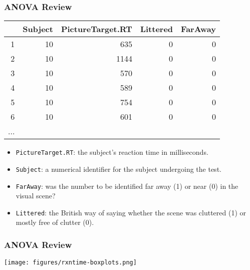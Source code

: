 \documentclass[11pt,containsverbatim,handout,xcolor=xelatex,dvipsnames,table]{beamer}
\begin{document}

\begin{frame}[fragile]
  \frametitle{ANOVA Review}
  
\begin{center}
{\small
\begin{tabular}{rrrrr}
  \hline
 & Subject & PictureTarget.RT & Littered & FarAway \\ 
  \hline
1 &  10 & 635 &   0 &   0 \\ 
  2 &  10 & 1144 &   0 &   0 \\ 
  3 &  10 & 570 &   0 &   0 \\ 
  4 &  10 & 589 &   0 &   0 \\ 
  5 &  10 & 754 &   0 &   0 \\ 
  6 &  10 & 601 &   0 &   0 \\ 
  ... \\
   \hline
\end{tabular}
}
\end{center}

\small
\begin{itemize}
\item \texttt{PictureTarget.RT}: the subject's reaction time in milliseconds.
\item \texttt{Subject}: a numerical identifier for the subject undergoing the test.
\item \texttt{FarAway}: was the number to be identified far away (1) or near (0) in the visual scene?
\item \texttt{Littered}: the British way of saying whether the scene was cluttered (1) or mostly free of clutter (0).
\end{itemize}

\end{frame}



\begin{frame}
  \frametitle{ANOVA Review}


  \begin{center}
  \texttt{[image: figures/rxntime-boxplots.png]}
  \end{center}

\end{frame}


\end{document}
